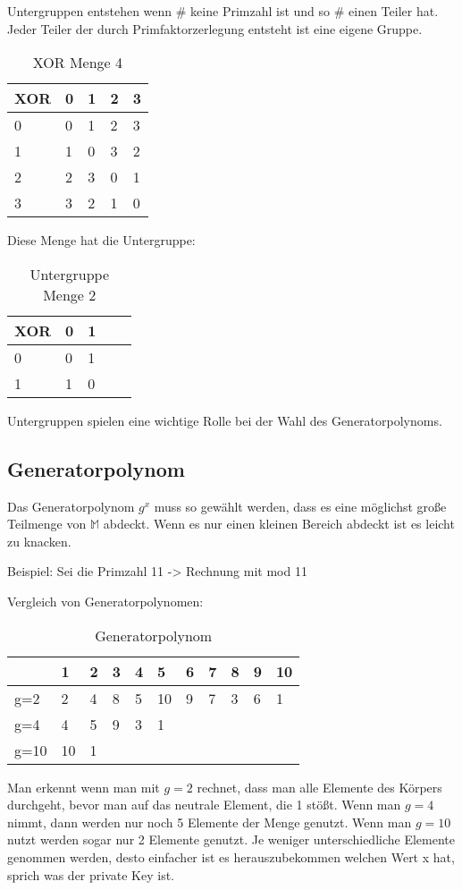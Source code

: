 Untergruppen entstehen wenn $\#$ keine Primzahl ist und so $\#$ einen Teiler hat. Jeder Teiler der durch Primfaktorzerlegung entsteht ist eine eigene Gruppe.

\begin{table}[H]
\centering
\begin{tabular}{|l|l|l|l|l|}
\hline
XOR & 0 & 1 & 2 & 3 \\ \hline
0   & 0 & 1 & 2 & 3 \\ \hline
1   & 1 & 0 & 3 & 2 \\ \hline
2   & 2 & 3 & 0 & 1 \\ \hline
3   & 3 & 2 & 1 & 0 \\ \hline
\end{tabular}
\caption{XOR Menge 4}
\label{xorMEnge4}
\end{table}

Diese Menge hat die Untergruppe:

\begin{table}[H]
\centering
\begin{tabular}{|l|l|l|l|l|}
\hline
XOR & 0 & 1 \\ \hline
0   & 0 & 1  \\ \hline
1   & 1 & 0 \\ \hline
\end{tabular}
\caption{Untergruppe Menge 2}
\label{Menge 2}
\end{table}
 
Untergruppen spielen eine wichtige Rolle bei der Wahl des Generatorpolynoms.

\subsection{Generatorpolynom}
\label{sec:generatorpolynom}

Das Generatorpolynom $g^{x}$ muss so gewählt werden, dass es eine möglichst große Teilmenge von $\mathbb{M}$ abdeckt. Wenn es nur einen kleinen Bereich abdeckt ist es leicht zu knacken.

Beispiel:
Sei die Primzahl 11 -> Rechnung mit mod 11

Vergleich von Generatorpolynomen:
\begin{table}[H]
\centering
\begin{tabular}{|l|l|l|l|l|l|l|l|l|l|l|}
\hline
     & 1  & 2 & 3 & 4 & 5  & 6 & 7 & 8 & 9 & 10 \\ \hline
g=2  & 2  & 4 & 8 & 5 & 10 & 9 & 7 & 3 & 6 & 1  \\ \hline
g=4  & 4  & 5 & 9 & 3 & 1  &   &   &   &   &    \\ \hline
g=10 & 10 & 1 &   &   &    &   &   &   &   &    \\ \hline
\end{tabular}
\caption{Generatorpolynom}
\label{generatorpolynom}
\end{table}

Man erkennt wenn man mit $g=2$ rechnet, dass man alle Elemente des Körpers durchgeht, bevor man auf das neutrale Element, die 1 stößt. Wenn man $g=4$ nimmt, dann werden nur noch 5 Elemente der Menge genutzt. Wenn man $g=10$ nutzt werden sogar nur 2 Elemente genutzt. Je weniger unterschiedliche Elemente genommen werden, desto einfacher ist es herauszubekommen welchen Wert x hat, sprich was der private Key ist.